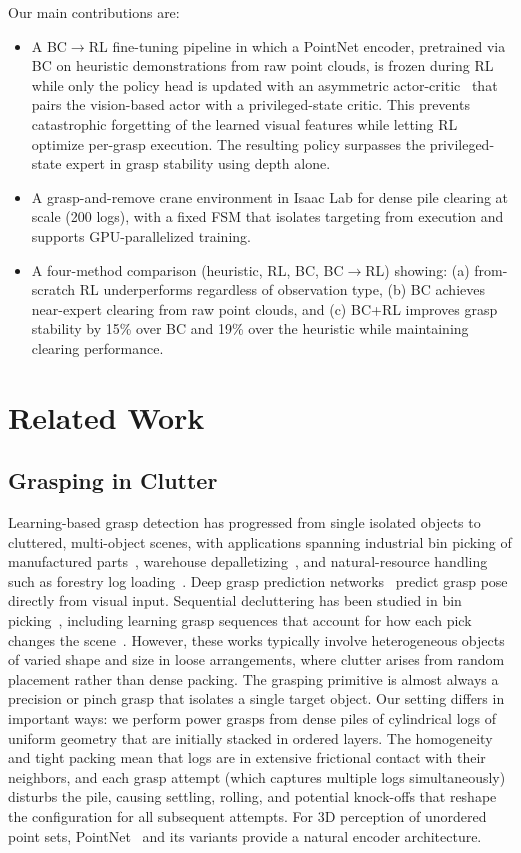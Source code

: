 \documentclass[conference]{IEEEtran}
\begin{document}
Our main contributions are:
\begin{itemize}
    \item A BC$\to$RL fine-tuning pipeline in which a PointNet encoder, pretrained via BC on heuristic demonstrations from raw point clouds, is frozen during RL while only the policy head is updated with an asymmetric actor-critic~\cite{pinto2018asymmetric} that pairs the vision-based actor with a privileged-state critic. This prevents catastrophic forgetting of the learned visual features while letting RL optimize per-grasp execution. The resulting policy surpasses the privileged-state expert in grasp stability using depth alone.
    \item A grasp-and-remove crane environment in Isaac Lab for dense pile clearing at scale (200 logs), with a fixed FSM that isolates targeting from execution and supports GPU-parallelized training.
    \item A four-method comparison (heuristic, RL, BC, BC$\to$RL) showing: (a) from-scratch RL underperforms regardless of observation type, (b) BC achieves near-expert clearing from raw point clouds, and (c) BC+RL improves grasp stability by 15\% over BC and 19\% over the heuristic while maintaining clearing performance.
\end{itemize}

\section{Related Work}

\subsection{Grasping in Clutter}
Learning-based grasp detection has progressed from single isolated objects to cluttered, multi-object scenes, with applications spanning industrial bin picking of manufactured parts~\cite{mahler2017dexnet}, warehouse depalletizing~\cite{zeng2018learning}, and natural-resource handling such as forestry log loading~\cite{wallin2024multilog}.
Deep grasp prediction networks~\cite{morrison2018closing, kumra2017robotic} predict grasp pose directly from visual input.
Sequential decluttering has been studied in bin picking~\cite{mahler2017dexnet, zeng2018learning}, including learning grasp sequences that account for how each pick changes the scene~\cite{mahler2017sequential}.
However, these works typically involve heterogeneous objects of varied shape and size in loose arrangements, where clutter arises from random placement rather than dense packing.
The grasping primitive is almost always a precision or pinch grasp that isolates a single target object.
Our setting differs in important ways: we perform power grasps from dense piles of cylindrical logs of uniform geometry that are initially stacked in ordered layers.
The homogeneity and tight packing mean that logs are in extensive frictional contact with their neighbors, and each grasp attempt (which captures multiple logs simultaneously) disturbs the pile, causing settling, rolling, and potential knock-offs that reshape the configuration for all subsequent attempts.
For 3D perception of unordered point sets, PointNet~\cite{qi2017pointnet} and its variants provide a natural encoder architecture.
\end{document}
